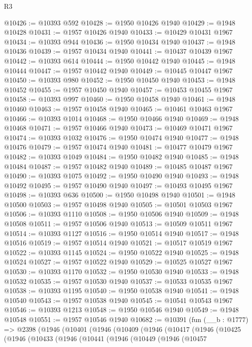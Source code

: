 \begin{lexlean}{R3}
\begin{coremodule}
@10426 := @10393 @592
@10428 := @1950 @10426 @1940
@10429 := @1948 @10428
@10431 := @1957 @10426 @1940
@10433 := @10429 @10431 @1967
@10434 := @10393 @944
@10436 := @1950 @10434 @1940
@10437 := @1948 @10436
@10439 := @1957 @10434 @1940
@10441 := @10437 @10439 @1967
@10442 := @10393 @614
@10444 := @1950 @10442 @1940
@10445 := @1948 @10444
@10447 := @1957 @10442 @1940
@10449 := @10445 @10447 @1967
@10450 := @10393 @980
@10452 := @1950 @10450 @1940
@10453 := @1948 @10452
@10455 := @1957 @10450 @1940
@10457 := @10453 @10455 @1967
@10458 := @10393 @997
@10460 := @1950 @10458 @1940
@10461 := @1948 @10460
@10463 := @1957 @10458 @1940
@10465 := @10461 @10463 @1967
@10466 := @10393 @1014
@10468 := @1950 @10466 @1940
@10469 := @1948 @10468
@10471 := @1957 @10466 @1940
@10473 := @10469 @10471 @1967
@10474 := @10393 @1032
@10476 := @1950 @10474 @1940
@10477 := @1948 @10476
@10479 := @1957 @10474 @1940
@10481 := @10477 @10479 @1967
@10482 := @10393 @1049
@10484 := @1950 @10482 @1940
@10485 := @1948 @10484
@10487 := @1957 @10482 @1940
@10489 := @10485 @10487 @1967
@10490 := @10393 @1075
@10492 := @1950 @10490 @1940
@10493 := @1948 @10492
@10495 := @1957 @10490 @1940
@10497 := @10493 @10495 @1967
@10498 := @10393 @636
@10500 := @1950 @10498 @1940
@10501 := @1948 @10500
@10503 := @1957 @10498 @1940
@10505 := @10501 @10503 @1967
@10506 := @10393 @1110
@10508 := @1950 @10506 @1940
@10509 := @1948 @10508
@10511 := @1957 @10506 @1940
@10513 := @10509 @10511 @1967
@10514 := @10393 @1127
@10516 := @1950 @10514 @1940
@10517 := @1948 @10516
@10519 := @1957 @10514 @1940
@10521 := @10517 @10519 @1967
@10522 := @10393 @1145
@10524 := @1950 @10522 @1940
@10525 := @1948 @10524
@10527 := @1957 @10522 @1940
@10529 := @10525 @10527 @1967
@10530 := @10393 @1170
@10532 := @1950 @10530 @1940
@10533 := @1948 @10532
@10535 := @1957 @10530 @1940
@10537 := @10533 @10535 @1967
@10538 := @10393 @1195
@10540 := @1950 @10538 @1940
@10541 := @1948 @10540
@10543 := @1957 @10538 @1940
@10545 := @10541 @10543 @1967
@10546 := @10393 @1213
@10548 := @1950 @10546 @1940
@10549 := @1948 @10548
@10551 := @1957 @10546 @1940
@10682 := @10391
    (fun (__b : @1777) =>
    @2398
      (@1946
        (@10401
          (@1946
            (@10409
              (@1946
                (@10417
                  (@1946
                    (@10425
                      (@1946
                        (@10433
                          (@1946
                            (@10441
                              (@1946
                                (@10449
                                  (@1946
                                    (@10457

\end{coremodule}
\end{lexlean}
